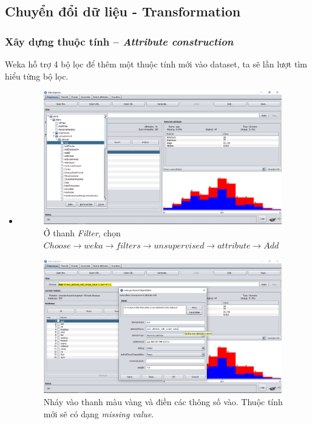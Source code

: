 \subsection{Chuyển đổi dữ liệu - Transformation}
\subsubsection{Xây dựng thuộc tính – \textit{Attribute construction}}
Weka hỗ trợ 4 bộ lọc để thêm một thuộc tính mới vào dataset, ta sẽ lần lượt tìm hiểu từng bộ lọc.
\begin{itemize}
	\item {}
	\begin{figure}[H]
\centering
\includegraphics[width=0.98\textwidth]{5/a1.png}
\caption{Ở thanh \textit{Filter}, chọn \textit{$Choose \rightarrow weka \rightarrow filters \rightarrow unsupervised \rightarrow attribute \rightarrow Add$}}
\end{figure}

\begin{figure}[H]
\centering
\includegraphics[width=0.98\textwidth]{5/a2.png}
\caption{Nháy vào thanh màu vàng và điền các thông số vào. Thuộc tính mới sẽ có dạng \textit{missing value}.}
\end{figure}


\end{itemize}
